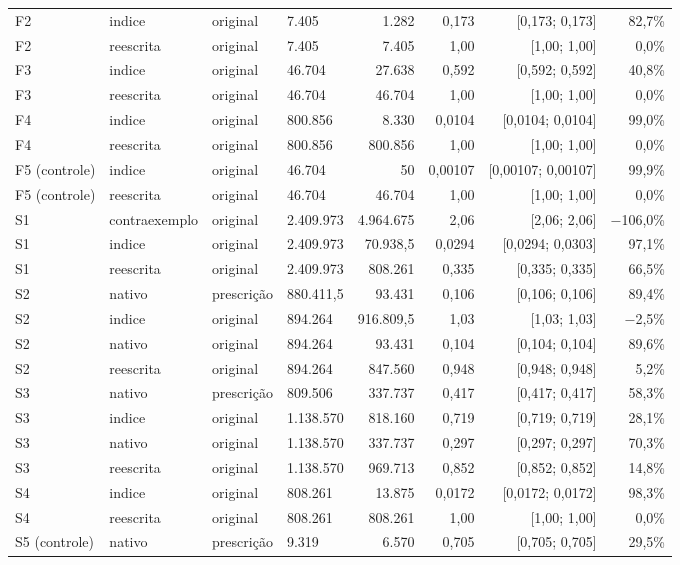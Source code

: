 {\begin{tabular}{llllrrrr}
F2 & indice & original & 7.405 & 1.282 & 0,173 & [0,173; 0,173] & 82,7\% \\
F2 & reescrita & original & 7.405 & 7.405 & 1,00 & [1,00; 1,00] & 0,0\% \\
F3 & indice & original & 46.704 & 27.638 & 0,592 & [0,592; 0,592] & 40,8\% \\
F3 & reescrita & original & 46.704 & 46.704 & 1,00 & [1,00; 1,00] & 0,0\% \\
F4 & indice & original & 800.856 & 8.330 & 0,0104 & [0,0104; 0,0104] & 99,0\% \\
F4 & reescrita & original & 800.856 & 800.856 & 1,00 & [1,00; 1,00] & 0,0\% \\
F5 (controle) & indice & original & 46.704 & 50 & 0,00107 & [0,00107; 0,00107] & 99,9\% \\
F5 (controle) & reescrita & original & 46.704 & 46.704 & 1,00 & [1,00; 1,00] & 0,0\% \\
S1 & contraexemplo & original & 2.409.973 & 4.964.675 & 2,06 & [2,06; 2,06] & $-$106,0\% \\
S1 & indice & original & 2.409.973 & 70.938,5 & 0,0294 & [0,0294; 0,0303] & 97,1\% \\
S1 & reescrita & original & 2.409.973 & 808.261 & 0,335 & [0,335; 0,335] & 66,5\% \\
S2 & nativo & prescrição & 880.411,5 & 93.431 & 0,106 & [0,106; 0,106] & 89,4\% \\
S2 & indice & original & 894.264 & 916.809,5 & 1,03 & [1,03; 1,03] & $-$2,5\% \\
S2 & nativo & original & 894.264 & 93.431 & 0,104 & [0,104; 0,104] & 89,6\% \\
S2 & reescrita & original & 894.264 & 847.560 & 0,948 & [0,948; 0,948] & 5,2\% \\
S3 & nativo & prescrição & 809.506 & 337.737 & 0,417 & [0,417; 0,417] & 58,3\% \\
S3 & indice & original & 1.138.570 & 818.160 & 0,719 & [0,719; 0,719] & 28,1\% \\
S3 & nativo & original & 1.138.570 & 337.737 & 0,297 & [0,297; 0,297] & 70,3\% \\
S3 & reescrita & original & 1.138.570 & 969.713 & 0,852 & [0,852; 0,852] & 14,8\% \\
S4 & indice & original & 808.261 & 13.875 & 0,0172 & [0,0172; 0,0172] & 98,3\% \\
S4 & reescrita & original & 808.261 & 808.261 & 1,00 & [1,00; 1,00] & 0,0\% \\
S5 (controle) & nativo & prescrição & 9.319 & 6.570 & 0,705 & [0,705; 0,705] & 29,5\% \\

\end{tabular}}

